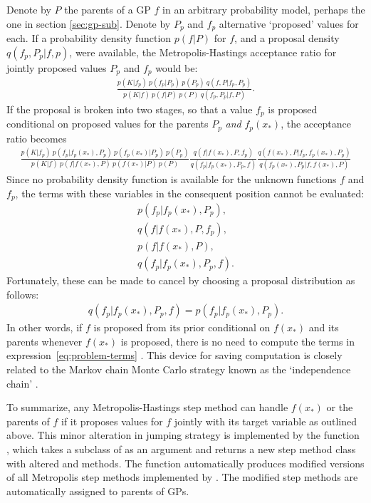 \documentclass[article]{jss}
\begin{document}
Denote by $P$ the parents of a GP $f$ in an arbitrary probability model, perhaps the one in section \ref{sec:gp-sub}. Denote by $P_p$ and $f_p$ alternative `proposed' values for each. If a probability density function $p(f|P)$ for $f$, and a proposal density $q(f_p,P_p|f,p)$, were available, the Metropolis-Hastings acceptance ratio for jointly proposed values $P_p$ and $f_p$ would be:
\begin{eqnarray*}
    \frac{p(K|f_p)\ p(f_p|P_p)\ p(P_p)\ q(f,P|f_p,P_p)}{p(K|f)\ p(f|P)\ p(P)\ q(f_p,P_p|f,P)}.
\end{eqnarray*}
If the proposal is broken into two stages, so that a value $f_p$ is proposed conditional on proposed values for the parents $P_p$ \emph{and} $f_p(x_*)$, the acceptance ratio becomes
\begin{eqnarray*}
    \frac{p(K|f_p)\ p(f_p|f_p(x_*), P_p)\ p(f_p(x_*) | P_p)\ p(P_p)}{p(K|f)\ p(f|f(x_*), P)\ p(f(x_*) | P)\ p(P)}
    \frac{q(f|f(x_*),P,f_p)  }{q(f_p|f_p(x_*),P_p,f)}
    \frac{q(f(x_*),P|f_p,f_p(x_*),P_p)}{q(f_p(x_*),P_p|f,f(x_*), P)}
\end{eqnarray*}
Since no probability density function is available for the unknown functions $f$ and $f_p$, the terms with these variables in the consequent position cannot be evaluated:
\begin{equation}
    \label{eq:problem-terms} 
    \begin{array}{r}
        p(f_p|f_p(x_*), P_p),\\ q(f|f(x_*),P,f_p),\\ p(f|f(x_*), P),\\ q(f_p|f_p(x_*), P_p, f).
    \end{array}
\end{equation}
Fortunately, these can be made to cancel by choosing a proposal distribution as follows:
\begin{eqnarray*}
    q(f_p|f_p(x_*),P_p,f) = p(f_p|f_p(x_*), P_p).
\end{eqnarray*}
In other words, if $f$ is proposed from its prior conditional on $f(x_*)$ and its parents whenever $f(x_*)$ is proposed, there is no need to compute the terms in expression~\ref{eq:problem-terms} . This device for saving computation is closely related to the Markov chain Monte Carlo strategy known as the `independence chain' \citep{tierney}. 

\smallskip

To summarize, any Metropolis-Hastings step method can handle $f(x_*)$ or the parents of $f$ if it proposes values for $f$ jointly with its target variable as outlined above. This minor alteration in jumping strategy is implemented by the function \\, which takes a subclass of  as an argument and returns a new step method class with altered  and  methods. The function automatically produces modified versions of all Metropolis step methods implemented by  \citep{pymc}. The modified step methods are automatically assigned to parents of GPs.
\end{document}
